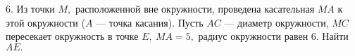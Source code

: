 6. Из точки $M,$ расположенной вне окружности, проведена касательная $MA$ к этой окружности ($A$ --- точка касания). Пусть $AC$ --- диаметр окружности, $MC$ пересекает окружность в точке $E,\ MA=5,$ радиус окружности равен 6. Найти $AE.$\\
